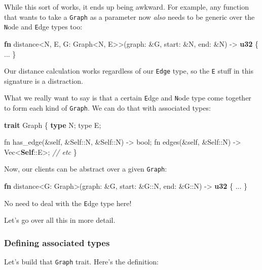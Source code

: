 \documentclass[a4paper,]{book}
\newenvironment{Shaded}{\begin{snugshade}}{\end{snugshade}}
\newcommand{\KeywordTok}[1]{\textcolor[rgb]{0.13,0.29,0.53}{\textbf{{#1}}}}
\newcommand{\CommentTok}[1]{\textcolor[rgb]{0.56,0.35,0.01}{\textit{{#1}}}}
\newcommand{\NormalTok}[1]{{#1}}
\begin{document}
While this sort of works, it ends up being awkward. For example, any
function that wants to take a \texttt{Graph} as a parameter now
\emph{also} needs to be generic over the \texttt{N}ode and \texttt{E}dge
types too:

\begin{Shaded}
\begin{Highlighting}[]
\KeywordTok{fn} \NormalTok{distance<N, E, G: Graph<N, E>>(graph: &G, start: &N, end: &N) -> }\KeywordTok{u32} \NormalTok{\{ ... \}}
\end{Highlighting}
\end{Shaded}

Our distance calculation works regardless of our \texttt{Edge} type, so
the \texttt{E} stuff in this signature is a distraction.

What we really want to say is that a certain \texttt{E}dge and
\texttt{N}ode type come together to form each kind of \texttt{Graph}. We
can do that with associated types:

\begin{Shaded}
\begin{Highlighting}[]
\KeywordTok{trait} \NormalTok{Graph \{}
    \KeywordTok{type} \NormalTok{N;}
    \NormalTok{type E;}

    \NormalTok{fn has_edge(&self, &Self::N, &Self::N) -> bool;}
    \NormalTok{fn edges(&self, &Self::N) -> Vec<}\KeywordTok{Self}\NormalTok{::E>;}
    \CommentTok{// etc}
\NormalTok{\}}
\end{Highlighting}
\end{Shaded}

Now, our clients can be abstract over a given \texttt{Graph}:

\begin{Shaded}
\begin{Highlighting}[]
\KeywordTok{fn} \NormalTok{distance<G: Graph>(graph: &G, start: &G::N, end: &G::N) -> }\KeywordTok{u32} \NormalTok{\{ ... \}}
\end{Highlighting}
\end{Shaded}

No need to deal with the \texttt{E}dge type here!

Let's go over all this in more detail.

\subsubsection{Defining associated
types}\label{defining-associated-types}

Let's build that \texttt{Graph} trait. Here's the definition:
\end{document}
